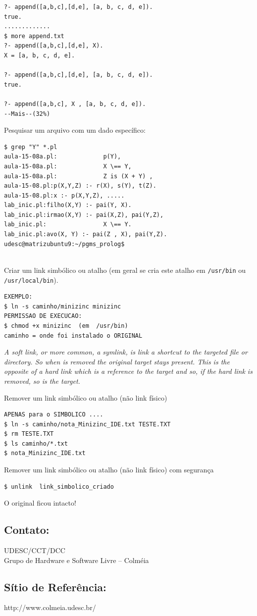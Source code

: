 \documentclass[final,a4paper]{article}
\begin{document}
\begin{description}
\begin{verbatim}
?- append([a,b,c],[d,e], [a, b, c, d, e]).
true.
.............
$ more append.txt 
?- append([a,b,c],[d,e], X).
X = [a, b, c, d, e].

?- append([a,b,c],[d,e], [a, b, c, d, e]).
true.

?- append([a,b,c], X , [a, b, c, d, e]).
--Mais--(32%)

\end{verbatim}


\pagebreak
\item[\ding{248}] Pesquisar um arquivo com um dado específico:
\begin{verbatim}
$ grep "Y" *.pl
aula-15-08a.pl:			    p(Y), 
aula-15-08a.pl:			    X \== Y, 
aula-15-08a.pl:			    Z is (X + Y) ,
aula-15-08.pl:p(X,Y,Z) :- r(X), s(Y), t(Z).
aula-15-08.pl:x :- p(X,Y,Z), .....
lab_inic.pl:filho(X,Y) :- pai(Y, X).
lab_inic.pl:irmao(X,Y) :- pai(X,Z), pai(Y,Z),
lab_inic.pl:				X \== Y.
lab_inic.pl:avo(X, Y) :- pai(Z , X), pai(Y,Z).				
udesc@matrizubuntu9:~/pgms_prolog$ 


\end{verbatim}

\pagebreak
\item[\ding{248}] Criar um link simbólico ou atalho (em geral se cria este atalho em \texttt{/usr/bin} ou \texttt{/usr/local/bin}). 
\begin{verbatim}
EXEMPLO:
$ ln -s caminho/minizinc minizinc
PERMISSAO DE EXECUCAO:
$ chmod +x minizinc  (em  /usr/bin)
caminho = onde foi instalado o ORIGINAL
\end{verbatim}

\emph{A soft link, or more common, a symlink, is link a shortcut to the targeted file or directory. So when is removed the original target stays present. This is the opposite of a hard link which is a reference to the target and so, if the hard link is removed, so is the target.}

\pagebreak
\item[\ding{248}] Remover um link simbólico ou atalho (não link físico)

\begin{verbatim}
APENAS para o SIMBOLICO ....
$ ln -s caminho/nota_Minizinc_IDE.txt TESTE.TXT
$ rm TESTE.TXT 
$ ls caminho/*.txt
$ nota_Minizinc_IDE.txt
\end{verbatim}

\pagebreak
\item[\ding{248}] Remover um link simbólico ou atalho (não link físico)
com segurança
\begin{verbatim}
$ unlink  link_simbolico_criado
\end{verbatim}
O original ficou intacto!

\end{description}




\newpage
\subsection{Contato:}
UDESC/CCT/DCC \\
Grupo de Hardware e Software Livre -- Colméia\\

\subsection{Sítio de Referência:}

\textsf{http://www.colmeia.udesc.br/}
\end{document}
